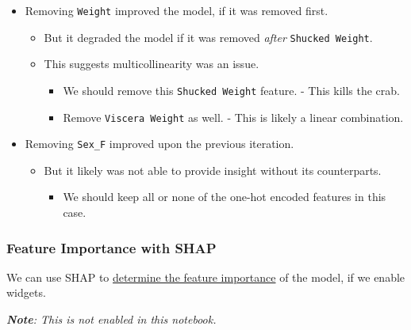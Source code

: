 \documentclass[11pt]{article}
\providecommand{\tightlist}{%
      \setlength{\itemsep}{0pt}\setlength{\parskip}{0pt}}
\begin{document}
\begin{itemize}
\tightlist
\item
  Removing \texttt{Weight} improved the model, if it was removed first.

  \begin{itemize}
  \tightlist
  \item
    But it degraded the model if it was removed \emph{after}
    \texttt{Shucked\ Weight}.
  \item
    This suggests multicollinearity was an issue.

    \begin{itemize}
    \tightlist
    \item
      We should remove this \texttt{Shucked\ Weight} feature. - This
      kills the crab.
    \item
      Remove \texttt{Viscera\ Weight} as well. - This is likely a linear
      combination.
    \end{itemize}
  \end{itemize}
\item
  Removing \texttt{Sex\_F} improved upon the previous iteration.

  \begin{itemize}
  \tightlist
  \item
    But it likely was not able to provide insight without its
    counterparts.

    \begin{itemize}
    \tightlist
    \item
      We should keep all or none of the one-hot encoded features in this
      case.
    \end{itemize}
  \end{itemize}
\end{itemize}

    \subsubsection{Feature Importance with
SHAP}\label{feature-importance-with-shap}

We can use SHAP to \href{https://stackoverflow.com/a/69523421}{determine
the feature importance} of the model, if we enable widgets.

\emph{\textbf{Note}: This is not enabled in this notebook.}
\end{document}
